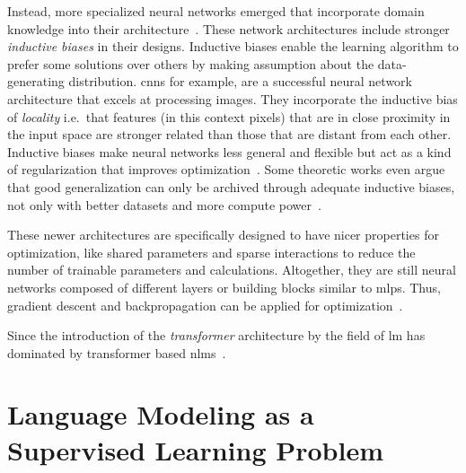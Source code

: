 Instead, more specialized neural networks emerged that incorporate domain knowledge into their architecture~\autocite{Goodfellow-et-al-2016}.
These network architectures include stronger \textit{inductive biases} in their designs.
Inductive biases enable the learning algorithm to prefer some solutions over others by making assumption about the data-generating distribution.
\glspl{cnn} for example, are a successful neural network architecture that excels at processing images.
They incorporate the inductive bias of \textit{locality} i.e.\ that features (in this context pixels) that are in close proximity in the input space are stronger related than those that are distant from each other.
Inductive biases make neural networks less general and flexible but act as a kind of regularization that improves optimization~\autocite{battaglia2018relationalinductivebiasesdeep}.
Some theoretic works even argue that good generalization can only be archived through adequate inductive biases, not only with better datasets and more compute power~\autocite{goyal2022inductive}.

These newer architectures are specifically designed to have nicer properties for optimization, like shared parameters and sparse interactions to reduce the number of trainable parameters and calculations.
Altogether, they are still neural networks composed of different layers or building blocks similar to \glspl{mlp}.
Thus, gradient descent and backpropagation can be applied for optimization~\autocite{Goodfellow-et-al-2016}.

Since the introduction of the \textit{transformer} architecture by \textcite{vaswani2023attention} the field of \acrlong{lm} has dominated by transformer based \glspl{nlm}~\autocite{cazenavette2021bias}.




\section{Language Modeling as a Supervised Learning Problem}\label{sec:lm-as-supervised}

